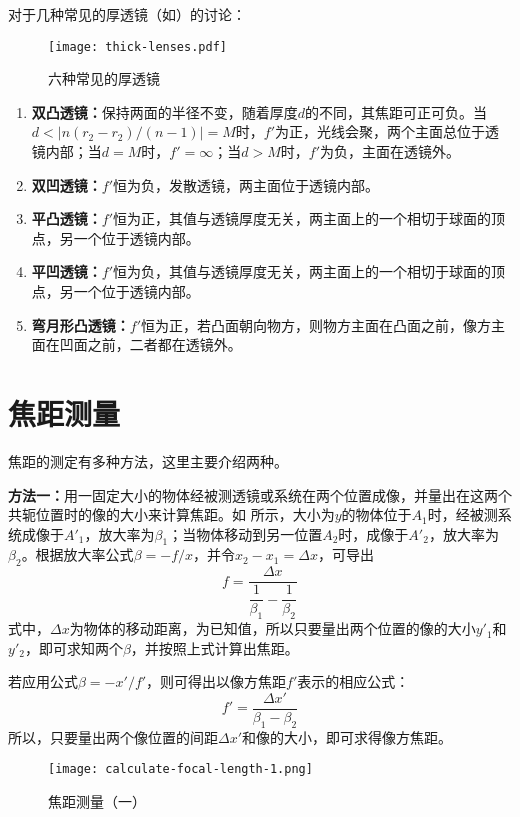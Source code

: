 \documentclass[cn,10pt,chinesefont=founder,math=mtpro2,cite=super,toc=onecol,twoside,openany]{elegantbook}
\begin{document}
对于几种常见的厚透镜（如）的讨论：
\begin{figure}[htbp]
	\centering
	\texttt{[image: thick-lenses.pdf]}
	\caption{六种常见的厚透镜}
	\label{fig:thick-lenses}
\end{figure}
\begin{enumerate}
	\item \textbf{双凸透镜：}保持两面的半径不变，随着厚度$d$的不同，其焦距可正可负。当$d<|n(r_2-r_2)/(n-1)|=M$时，$f'$为正，光线会聚，两个主面总位于透镜内部；当$d=M$时，$f'=\infty$；当$d>M$时，$f'$为负，主面在透镜外。
	\item \textbf{双凹透镜：}$f'$恒为负，发散透镜，两主面位于透镜内部。
	\item \textbf{平凸透镜：}$f'$恒为正，其值与透镜厚度无关，两主面上的一个相切于球面的顶点，另一个位于透镜内部。
	\item \textbf{平凹透镜：}$f'$恒为负，其值与透镜厚度无关，两主面上的一个相切于球面的顶点，另一个位于透镜内部。
	\item \textbf{弯月形凸透镜：}$f'$恒为正，若凸面朝向物方，则物方主面在凸面之前，像方主面在凹面之前，二者都在透镜外。
\end{enumerate}

\section{焦距测量}
焦距的测定有多种方法，这里主要介绍两种。

\textbf{方法一：}用一固定大小的物体经被测透镜或系统在两个位置成像，并量出在这两个共轭位置时的像的大小来计算焦距。如 所示，大小为$y$的物体位于$A_1$时，经被测系统成像于$A'_1$，放大率为$\beta_1$；当物体移动到另一位置$A_2$时，成像于$A'_2$，放大率为$\beta_2$。根据放大率公式$\beta=-f/x$，并令$x_2-x_1=\Delta x$，可导出
\begin{equation}
f=\frac{\Delta x}{\dfrac{1}{\beta_1}-\dfrac{1}{\beta_2}}
\end{equation}
式中，$\Delta x$为物体的移动距离，为已知值，所以只要量出两个位置的像的大小$y'_1$和$y'_2$，即可求知两个$\beta$，并按照上式计算出焦距。

若应用公式$\beta=-x'/f'$，则可得出以像方焦距$f'$表示的相应公式：
\begin{equation}
f'=\frac{\Delta x'}{\beta_1-\beta_2}
\end{equation}
所以，只要量出两个像位置的间距$\Delta x'$和像的大小，即可求得像方焦距。

\begin{figure}[htbp]
	\centering
	\texttt{[image: calculate-focal-length-1.png]}
	\caption{焦距测量（一）}
	\label{fig:calculate-focal-length-1}
\end{figure}
\end{document}
